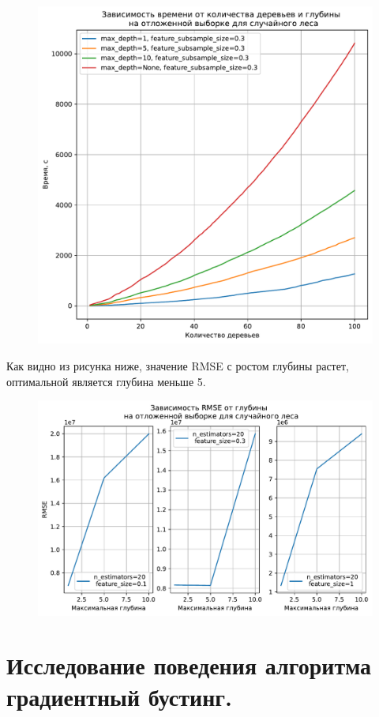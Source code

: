 \documentclass[a4paper, 12pt]{report}
\begin{document}
\begin{figure}[H]
        	\centering
        	\includegraphics[width=0.73\linewidth]{ex1_2.pdf}
        	\label{fig:mpr}
        	\vspace{-23pt}
\end{figure}

Как видно из рисунка ниже, значение RMSE с ростом глубины растет, оптимальной является глубина меньше 5.

\begin{figure}[H]
        	\centering
        	\includegraphics[width=0.8\linewidth]{ex1_3.pdf}
        	\label{fig:mpr}
        	\vspace{-25pt}
\end{figure}

\section{Исследование поведения алгоритма градиентный бустинг.}  
\end{document}
